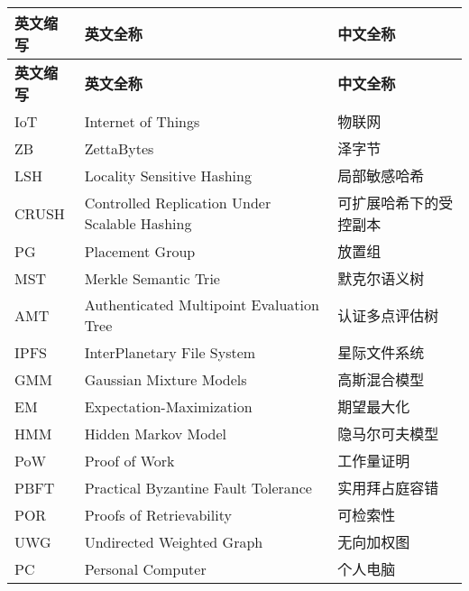 \cleardoublepage
{}
\begin{center}
    \begin{longtable}{m{2cm}m{8cm}m{5cm}}
        \toprule
        \textbf{英文缩写}&\textbf{英文全称}&\textbf{中文全称}\\
        \midrule
        \endfirsthead
        \toprule
        \textbf{英文缩写}&\textbf{英文全称}&\textbf{中文全称}\\
        \midrule
        \endhead 
        \bottomrule
        \endfoot
        \bottomrule
        \endlastfoot
        IoT&Internet of Things&物联网\\
        ZB&ZettaBytes&泽字节\\
        LSH&Locality Sensitive Hashing&局部敏感哈希\\
        CRUSH&Controlled Replication Under Scalable Hashing&可扩展哈希下的受控副本\\
        PG&Placement Group&放置组\\
        MST&Merkle Semantic Trie&默克尔语义树\\
        AMT&Authenticated Multipoint Evaluation Tree&认证多点评估树\\
        IPFS&InterPlanetary File System&星际文件系统\\
        GMM&Gaussian Mixture Models&高斯混合模型\\
        EM&Expectation-Maximization&期望最大化\\
        HMM&Hidden Markov Model&隐马尔可夫模型\\
        PoW&Proof of Work&工作量证明\\
        PBFT&Practical Byzantine Fault Tolerance&实用拜占庭容错\\
        POR&Proofs of Retrievability&可检索性\\
        UWG&Undirected Weighted Graph&无向加权图\\
        PC&Personal Computer&个人电脑\\
	\end{longtable}
\end{center}